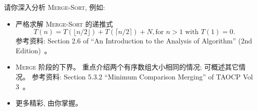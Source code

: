 \documentclass[a4paper, justified]{tufte-handout}
\begin{document}
\vspace{0.50cm}
\begin{ot}
  请你深入分析 \textsc{Merge-Sort}, 例如:
  \begin{itemize}
    \item 严格求解 \textsc{Merge-Sort} 的递推式
      \[
        T(n) = T(\lfloor n/2 \rfloor) + T(\lceil n/2 \rceil) + N, \text{for } n > 1 \text{ with } T(1) = 0.
      \]
      参考资料: Section 2.6 of ``An Introduction to the Analysis of Algorithm'' (2nd Edition)~\cite{AoA}。
    \item \textsc{Merge} 阶段的下界。
      重点介绍两个有序数组大小相同的情况; 可概述其它情况。
      参考资料: Section 5.3.2 ``Minimum Comparison Merging'' of TAOCP Vol 3~\cite{TAOCP-Vol3}。
    \item 更多精彩, 由你掌握。
  \end{itemize}
\end{ot}




\beginfb



\end{document}
